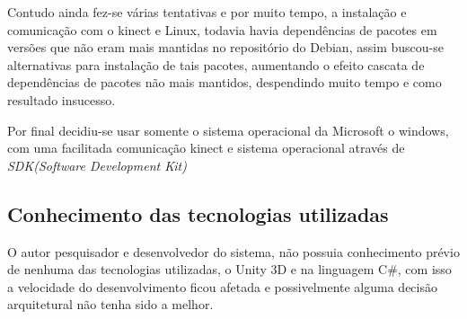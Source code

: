   Contudo ainda fez-se várias tentativas e por muito tempo,
a instalação e comunicação com o kinect e Linux, todavia havia dependências de pacotes em versões que não eram mais
mantidas no repositório do Debian, assim buscou-se alternativas para instalação de tais pacotes, aumentando o efeito cascata
de dependências de pacotes não mais mantidos, despendindo muito tempo e como resultado insucesso.

  Por final decidiu-se usar somente o sistema operacional da Microsoft o windows, com uma facilitada comunicação
kinect e sistema operacional através de \textit{SDK(Software Development Kit)}


\subsection{Conhecimento das tecnologias utilizadas}\label{pro:conhecimento}
  O autor pesquisador e desenvolvedor do sistema, não possuia conhecimento prévio de nenhuma das
tecnologias utilizadas, o Unity 3D e na linguagem C\#, com isso a velocidade do desenvolvimento ficou afetada
e possivelmente alguma decisão arquitetural não tenha sido a melhor.
